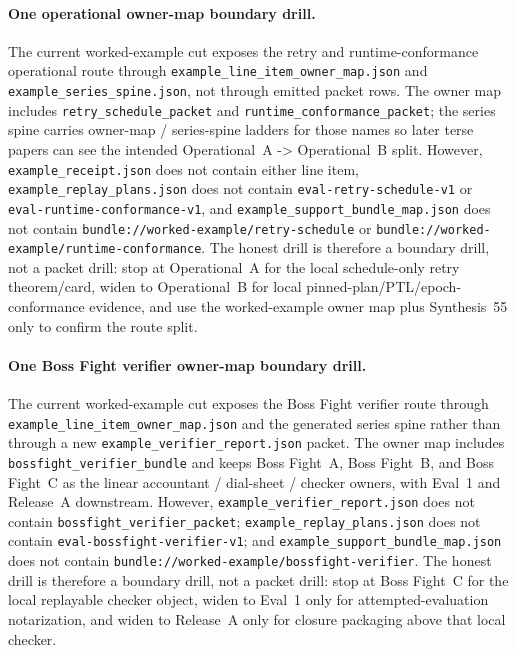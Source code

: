 \documentclass[11pt]{article}
\begin{document}
\paragraph{One operational owner-map boundary drill.}
The current worked-example cut exposes the retry and runtime-conformance operational route through \nolinkurl{example\_line\_item\_owner\_map.json} and \nolinkurl{example\_series\_spine.json}, not through emitted packet rows. The owner map includes \nolinkurl{retry\_schedule\_packet} and \nolinkurl{runtime\_conformance\_packet}; the series spine carries owner-map / series-spine ladders for those names so later terse papers can see the intended Operational~A -> Operational~B split. However, \nolinkurl{example\_receipt.json} does not contain either line item, \nolinkurl{example\_replay\_plans.json} does not contain \nolinkurl{eval-retry-schedule-v1} or \nolinkurl{eval-runtime-conformance-v1}, and \nolinkurl{example\_support\_bundle\_map.json} does not contain \nolinkurl{bundle://worked-example/retry-schedule} or \nolinkurl{bundle://worked-example/runtime-conformance}. The honest drill is therefore a boundary drill, not a packet drill: stop at Operational~A for the local schedule-only retry theorem/card, widen to Operational~B for local pinned-plan/PTL/epoch-conformance evidence, and use the worked-example owner map plus Synthesis~55 only to confirm the route split.\cite{series:profiling,series:schedretries,series:operationalB,series:bossfightA,series:advantagecontracts,series:releaseproperty,series:workedexample,series:seriesspines}

\paragraph{One Boss Fight verifier owner-map boundary drill.}
The current worked-example cut exposes the Boss Fight verifier route through \nolinkurl{example\_line\_item\_owner\_map.json} and the generated series spine rather than through a new \texttt{example\_verifier\_report.json} packet. The owner map includes \texttt{bossfight\_verifier\_bundle} and keeps Boss Fight~A, Boss Fight~B, and Boss Fight~C as the linear accountant / dial-sheet / checker owners, with Eval~1 and Release~A downstream. However, \texttt{example\_verifier\_report.json} does not contain \texttt{bossfight\_verifier\_packet}; \texttt{example\_replay\_plans.json} does not contain \texttt{eval-bossfight-verifier-v1}; and \texttt{example\_support\_bundle\_map.json} does not contain \texttt{bundle://worked-example/bossfight-verifier}. The honest drill is therefore a boundary drill, not a packet drill: stop at Boss Fight~C for the local replayable checker object, widen to Eval~1 only for attempted-evaluation notarization, and widen to Release~A only for closure packaging above that local checker.\cite{series:bossfightC,series:bossfightBaddendum,series:evalnotary,series:releaseproperty,series:workedexample,series:seriesspines}
\end{document}
